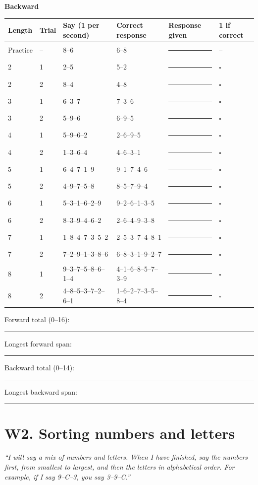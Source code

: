\documentclass[10pt,a4paper]{article}
\newcommand{\blank}[1][1.2cm]{\rule{#1}{0.4pt}}
\newcommand{\bx}{$\square$}
\begin{document}
\par{}\medskip\textbf{Backward}\par\begin{longtable}{@{}llp{4.2cm}p{4.2cm}p{3.4cm}l@{}}\toprule Length & Trial & Say (1 per second) & Correct response & Response given & 1 if correct\\ \midrule\endhead
Practice & -- & 8--6 & 6--8 & \blank[3.2cm] & --\\ \midrule
2 & 1 & 2--5 & 5--2 & \blank[3.2cm] & \bx\\
2 & 2 & 8--4 & 4--8 & \blank[3.2cm] & \bx\\\midrule
3 & 1 & 6--3--7 & 7--3--6 & \blank[3.2cm] & \bx\\
3 & 2 & 5--9--6 & 6--9--5 & \blank[3.2cm] & \bx\\\midrule
4 & 1 & 5--9--6--2 & 2--6--9--5 & \blank[3.2cm] & \bx\\
4 & 2 & 1--3--6--4 & 4--6--3--1 & \blank[3.2cm] & \bx\\\midrule
5 & 1 & 6--4--7--1--9 & 9--1--7--4--6 & \blank[3.2cm] & \bx\\
5 & 2 & 4--9--7--5--8 & 8--5--7--9--4 & \blank[3.2cm] & \bx\\\midrule
6 & 1 & 5--3--1--6--2--9 & 9--2--6--1--3--5 & \blank[3.2cm] & \bx\\
6 & 2 & 8--3--9--4--6--2 & 2--6--4--9--3--8 & \blank[3.2cm] & \bx\\\midrule
7 & 1 & 1--8--4--7--3--5--2 & 2--5--3--7--4--8--1 & \blank[3.2cm] & \bx\\
7 & 2 & 7--2--9--1--3--8--6 & 6--8--3--1--9--2--7 & \blank[3.2cm] & \bx\\\midrule
8 & 1 & 9--3--7--5--8--6--1--4 & 4--1--6--8--5--7--3--9 & \blank[3.2cm] & \bx\\
8 & 2 & 4--8--5--3--7--2--6--1 & 1--6--2--7--3--5--8--4 & \blank[3.2cm] & \bx\\\midrule
\bottomrule\end{longtable}
Forward total (0--16): \blank \quad Longest forward span: \blank \qquad Backward total (0--14): \blank \quad Longest backward span: \blank
\section*{W2. Sorting numbers and letters}
\textit{``I will say a mix of numbers and letters. When I have finished, say the numbers first, from smallest to largest, and then the letters in alphabetical order. For example, if I say 9--C--3, you say 3--9--C.''}
\end{document}
